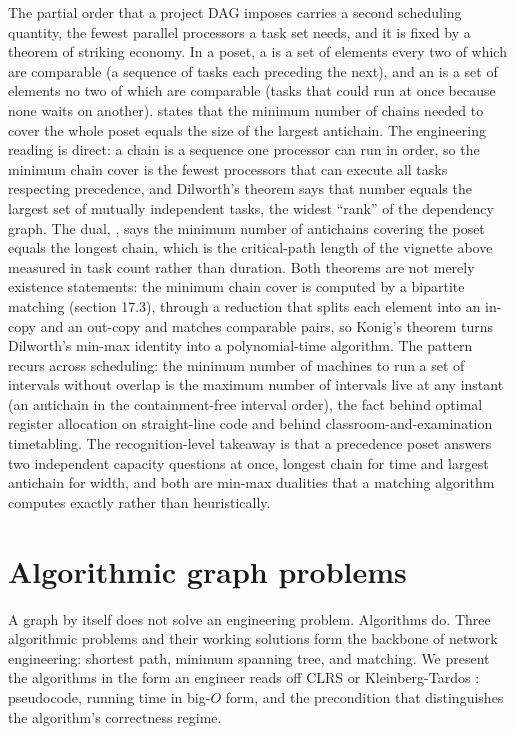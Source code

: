 \begin{mastery}
The partial order that a project DAG imposes carries a second scheduling
quantity, the fewest parallel processors a task set needs, and it is
fixed by a theorem of striking economy. In a poset, a  is
a set of elements every two of which are comparable (a sequence of tasks
each preceding the next), and an  is a set of
elements no two of which are comparable (tasks that could run at once
because none waits on another).  states that
the minimum number of chains needed to cover the whole poset equals the
size of the largest antichain. The engineering reading is direct: a
chain is a sequence one processor can run in order, so the minimum
chain cover is the fewest processors that can execute all tasks
respecting precedence, and Dilworth's theorem says that number equals
the largest set of mutually independent tasks, the widest ``rank'' of
the dependency graph. The dual, , says the
minimum number of antichains covering the poset equals the longest
chain, which is the critical-path length of the vignette above measured
in task count rather than duration. Both theorems are not merely
existence statements: the minimum chain cover is computed by a bipartite
matching (section 17.3), through a reduction that splits each element
into an in-copy and an out-copy and matches comparable pairs, so
Konig's theorem turns Dilworth's min-max identity into a
polynomial-time algorithm. The pattern recurs across scheduling: the
minimum number of machines to run a set of intervals without overlap is
the maximum number of intervals live at any instant (an antichain in the
containment-free interval order), the fact behind optimal register
allocation on straight-line code and behind classroom-and-examination
timetabling. The recognition-level takeaway is that a precedence poset
answers two independent capacity questions at once, longest chain for
time and largest antichain for width, and both are min-max dualities
that a matching algorithm computes exactly rather than heuristically.
\end{mastery}

\section{Algorithmic graph problems}

A graph by itself does not solve an engineering problem. Algorithms
do. Three algorithmic problems and their working solutions form the
backbone of network engineering: shortest path, minimum spanning
tree, and matching. We present the algorithms in the form an
engineer reads off CLRS \cite{text:cormen-clrs} or
Kleinberg-Tardos \cite{text:kleinberg-tardos}: pseudocode, running
time in big-$O$ form, and the precondition that distinguishes the
algorithm's correctness regime.

